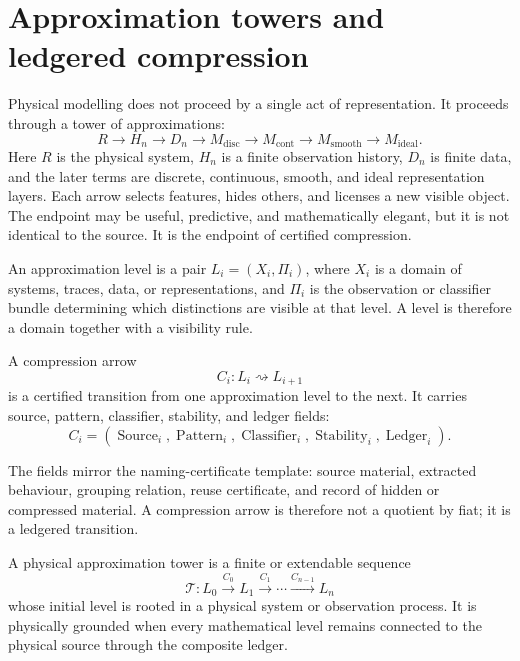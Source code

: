 \section{Approximation towers and ledgered compression}
\label{sec:approximation-towers-ledgered-compression}

Physical modelling does not proceed by a single act of representation. It proceeds through a tower of approximations:
$$
R
\longrightarrow
H_n
\longrightarrow
D_n
\longrightarrow
M_{\mathrm{disc}}
\longrightarrow
M_{\mathrm{cont}}
\longrightarrow
M_{\mathrm{smooth}}
\longrightarrow
M_{\mathrm{ideal}}.
$$
Here $R$ is the physical system, $H_n$ is a finite observation history, $D_n$ is finite data, and the later terms are discrete, continuous, smooth, and ideal representation layers. Each arrow selects features, hides others, and licenses a new visible object. The endpoint may be useful, predictive, and mathematically elegant, but it is not identical to the source. It is the endpoint of certified compression.

\begin{definition}
\label{def:approximation-level}
An approximation level is a pair $L_i=(X_i,\Pi_i)$, where $X_i$ is a domain of systems, traces, data, or representations, and $\Pi_i$ is the observation or classifier bundle determining which distinctions are visible at that level. A level is therefore a domain together with a visibility rule.
\end{definition}

\begin{definition}
\label{def:compression-arrow}
A compression arrow
$$
C_i:L_i\rightsquigarrow L_{i+1}
$$
is a certified transition from one approximation level to the next. It carries source, pattern, classifier, stability, and ledger fields:
$$
C_i
=
(\operatorname{Source}_i,
\operatorname{Pattern}_i,
\operatorname{Classifier}_i,
\operatorname{Stability}_i,
\operatorname{Ledger}_i).
$$
\end{definition}

The fields mirror the naming-certificate template: source material, extracted behaviour, grouping relation, reuse certificate, and record of hidden or compressed material. A compression arrow is therefore not a quotient by fiat; it is a ledgered transition.

\begin{definition}
\label{def:physical-approximation-tower}
A physical approximation tower is a finite or extendable sequence
$$
\mathcal T:
L_0
\xrightarrow{C_0}
L_1
\xrightarrow{C_1}
\cdots
\xrightarrow{C_{n-1}}
L_n
$$
whose initial level is rooted in a physical system or observation process. It is physically grounded when every mathematical level remains connected to the physical source through the composite ledger.
\end{definition}

